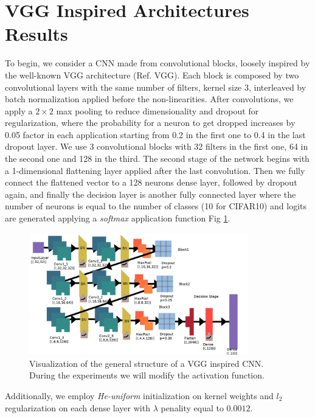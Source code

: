 \documentclass[LaM,binding=0.6cm]{./packages/sapthesis/sapthesis}
\begin{document}
    \section{VGG Inspired Architectures Results}
        
        To begin, we consider a CNN made from convolutional blocks, loosely inspired by the well-known 
        VGG architecture (Ref. VGG). Each block is composed by two convolutional layers with the same 
        number of filters, kernel size 3, interleaved by batch normalization applied before the 
        non-linearities. After convolutions, we apply a $2\times2$ max pooling to reduce dimensionality 
        and dropout for regularization, where the probability for a neuron to get dropped increases
        by 0.05 factor in each application starting from 0.2 in the first one to 0.4 in the last dropout layer.
        We use 3 convolutional blocks with 32 filters in the first one, 64 in the second one and 128 in the third.
        The second stage of the network begins with a 1-dimensional flattening layer applied after the last convolution. 
        Then we fully connect the flattened vector to a 128 neurons dense layer, followed by dropout again,
        and finally the decision layer is another fully connected layer where the number of neurons is equal 
        to the number of classes (10 for CIFAR10) and logits are generated applying a \textit{softmax} application 
        function Fig \ref{fig:vgg}.
        \begin{figure}[h!]
            \centering
            \includegraphics[width=0.85\textwidth]{VGG_inspired_arch}
            \caption{Visualization of the general structure of a VGG inspired CNN. During the experiments
            we will modify the activation function.}
            \label{fig:vgg}
        \end{figure}
        Additionally, we employ \textit{He-uniform} initialization on kernel weights and 
        \textit{$l_2$} regularization on each dense layer with $\lambda$ penality equal to $0.0012$. 
        
\end{document}
